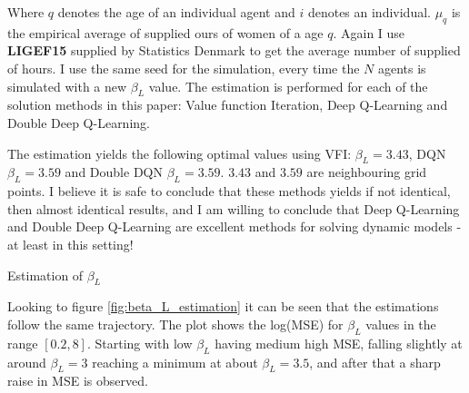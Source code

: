 Where $q$ denotes the age of an individual agent and $i$ denotes an individual. $\mu_q$ is the empirical average of supplied ours of women of a age 	$q$. Again I use \textbf{LIGEF15} supplied by Statistics Denmark to get the average number of supplied of hours. I use the same seed for the simulation, every time the $N$ agents is simulated with a new $\beta_L$ value. The estimation is performed for each of the solution methods in this paper: Value function Iteration, Deep Q-Learning and Double Deep Q-Learning. 

The estimation yields the following optimal values using VFI: $\beta_L=3.43$, DQN $\beta_L=3.59$ and Double DQN $\beta_L=3.59$. $3.43$ and $3.59$ are neighbouring grid points. I believe it is safe to conclude that these methods yields if not identical, then almost identical results, and I am willing to conclude that Deep Q-Learning and Double Deep Q-Learning are excellent methods for solving dynamic models - at least in this setting!

\begin{table}[ht]
    \centering
    
    \caption{Estimation of $\beta_L$}
    \label{tab:beta_L_Estimation}
\end{table}

Looking to figure \ref{fig:beta_L_estimation} it can be seen that the estimations follow the same trajectory. The plot shows the log(MSE) for $\beta_L$ values in the range $[0.2, 8]$. Starting with low $\beta_L$ having medium high MSE, falling slightly at around $\beta_L = 3$ reaching a minimum at about $\beta_L = 3.5$, and after that a sharp raise in MSE is observed. 

